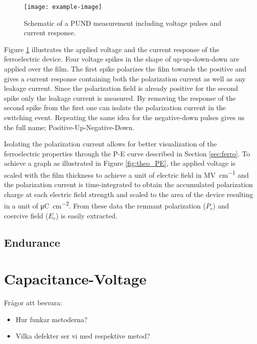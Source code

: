 \documentclass[11pt,twoside]{eitExjobb}
\begin{document}
\begin{figure}[htbp]
    \centering
    \texttt{[image: example-image]}
    \caption{Schematic of a PUND measurement including voltage pulses and
    current response.}
    \label{fig:char_PUND}
\end{figure}

Figure \ref{fig:char_PUND} illustrates the applied voltage and the current
response of the ferroelectric device. Four voltage spikes in the shape of
up-up-down-down are applied over the film. The first spike polarizes the film
towards the positive and gives a current response containing both the
polarization current as well as any leakage current. Since the polarization
field is already positive for the second spike only the leakage current is
measured. By removing the response of the second spike from the first one can
isolate the polarization current in the switching event. Repeating the same
idea for the negative-down pulses gives us the full name;
Positive-Up-Negative-Down.

Isolating the polarization current allows for better visualization of the
ferroelectric properties through the P-E curve described in Section
\ref{sec:ferro}. To achieve a graph as illustrated in Figure \ref{fig:theo_PE},
the applied voltage is scaled with the film thickness to achieve a unit of
electric field in \si{\mega\volt\per\centi\meter} and the polarization current
is time-integrated to obtain the accumulated polarization charge at each
electric field strength and scaled to the area of the device resulting in a
unit of \si{\micro\coulomb\per\centi\meter\squared}. From these data the
remnant polarization ($P_r$) and coercive field ($E_c$) is easily extracted.

\subsection{Endurance}\label{sec:Endu}


\section{Capacitance-Voltage}\label{sec:CV}

Frågor att besvara: 
\begin{itemize}
    \item Hur funkar metoderna? 
    \item Vilka defekter ser vi med respektive metod? 
\end{itemize}

\end{document}
